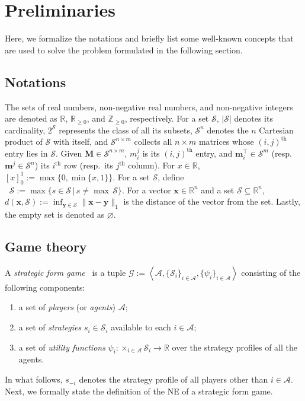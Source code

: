 \documentclass{IEEEtran}
\newcommand{\ldef}{:=}
\newcommand{\Mcal}[1]{\mathcal{#1}}
\newcommand{\Mc}[1]{\mathcal{#1}}
\newcommand{\tth}{^{\text{th}}}
\newcommand{\bld}[1]{\mathbf{#1}}
\newcommand{\integer}{\ensuremath{\mathbb{Z}}}
\newcommand{\real}{\ensuremath{\mathbb{R}}}
\newcommand{\marginn}[1]{\marginpar{\color{blue}\tiny\ttfamily#1}}
\newcommand{\margin}[1]{\marginpar{\color{magenta}\tiny\ttfamily#1}}
\def \agt{\Mcal{A}}
\def \game{\mathscr{G}}
\def \integer{\mathbb{Z}}
\def \intpos{\integer_{\geq 0}}
\def \M{\bld{M}}
\def \real{\mathbb{R}}
\def \S{\Mc{S}}
\def \set{\Mc{S}}
\def \x{\bld{x}}
\def \y{\bld{y}}
\DeclareMathOperator*{\submax}{max^{(2)}}
\begin{document}
\section{Preliminaries} \label{sec:prelim}
Here, we formalize the notations and briefly list some  well-known concepts that are used to solve the problem formulated in the following section. 

\subsection{Notations}
The sets of real numbers,  non-negative real
numbers, and non-negative integers are denoted
as $\real$, $\real_{\geq 0}$, and $\intpos$,
respectively. For a set $\set$, $|\set|$ denotes its cardinality, $2^\set$ represents the class of all its subsets, $\set^n$ denotes the $n$ Cartesian product of $\set$ with itself, and $\set^{n \times m}$ collects all
$n \times m$ matrices whose $(i,j)\tth$ entry lies in $\set$.  Given $\M \in \set^{n \times m}$, $m^j_i$ is its $(i,j)\tth$ entry, and $\bld{m}_i^\top \in \set^m$ (resp.~$\bld{m}^j \in \set^n$) its $i\tth$ row (resp.~its $j\tth$ column). %
For $x \in \real$, $[x]_0^1 \ldef \max \{0, \min \{ x , 1 \} \}$. For a set $\set$, define $\submax \set \ldef \max \{s \in \set \,|\, s \neq \max \,\set\}$. For a vector $\x \in \real^n$ and a set $\set \subseteq \real^n$, $d(\x,\set) \ldef \inf_{\y \in \set} \|\x-\y\|_1$ is the distance of the vector from the set. Lastly, the empty set is denoted as $\varnothing$. 

\subsection{Game theory}
A \emph{strategic form game}~\cite{YN:14} is a tuple $\game \ldef \left<\agt,\{\S_i\}_{i\in \agt}, \{\psi_i\}_{i \in \agt} \right>$ consisting of the following components:
\begin{enumerate}
	\item a set of \emph{players} (or \emph{agents}) $\agt$;
	\item a set of \emph{strategies} $s_i \in \S_i$ available to each $i \in \agt$;
	\item a set of \emph{utility functions} $\psi_i : \times_{i \in \agt}\S_i \to \real$ over the strategy profiles of all the agents.
\end{enumerate}
In what follows,  $s_{-i}$ denotes the strategy profile of all players other than $i \in \agt$. Next, we formally state the definition of the NE of a strategic form game.
\end{document}
